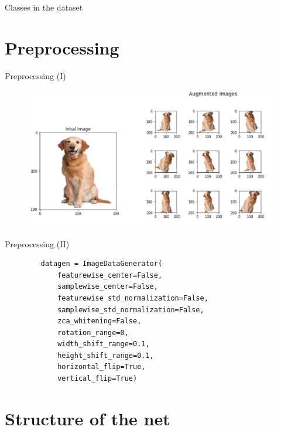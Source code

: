 \documentclass{beamer}
\begin{document}
\begin{frame}[fragile]{Classes in the dataset}
\end{frame}


\section{Preprocessing}

\begin{frame}[fragile]{Preprocessing (I)}
 \begin{figure}[H]
  \centering
  \includegraphics[scale=0.45]{img/image_augmentation.png}
 \end{figure}
\end{frame}

\begin{frame}[fragile]{Preprocessing (II)}
 \begin{figure}[H]
  \centering
  \begin{verbatim}
   datagen = ImageDataGenerator(
       featurewise_center=False,
       samplewise_center=False,
       featurewise_std_normalization=False,
       samplewise_std_normalization=False,
       zca_whitening=False,
       rotation_range=0,
       width_shift_range=0.1,
       height_shift_range=0.1,
       horizontal_flip=True,
       vertical_flip=True)
   \end{verbatim}
 \end{figure}
\end{frame}

\section{Structure of the net}
\end{document}
